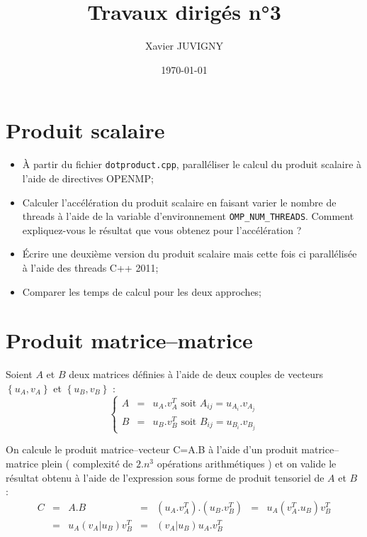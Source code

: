 \documentclass[11pt,a4paper]{article}
\author{Xavier JUVIGNY}
\date{\today}
\title{Travaux dirigés n°3}
\begin{document}
\maketitle
\tableofcontents

\section{Produit scalaire}

\begin{itemize}
\item \`A partir du fichier \texttt{dotproduct.cpp}, paralléliser le calcul du produit scalaire à l'aide de directives OPENMP;
\item Calculer l'accélération du produit scalaire en faisant varier le nombre de threads à l'aide de la variable d'environnement
\texttt{OMP\_NUM\_THREADS}. Comment expliquez-vous le résultat que vous obtenez pour l'accélération ?
\item \'Ecrire une deuxième version du produit scalaire mais cette fois ci parallélisée à l'aide des threads C++ 2011;
\item Comparer les temps de calcul pour les deux approches;
\end{itemize}

\section{Produit matrice--matrice}

Soient $A$ et $B$ deux matrices définies à l'aide de deux couples de vecteurs $\left\{u_{A},v_{A}\right\}$ et 
$\left\{u_{B},v_{B}\right\}$ :
\[
\left\{
	\begin{array}{lcl}
	A & = & u_{A}.v_{A}^{T}\mbox{ soit } A_{ij} = u_{A_{i}}.v_{A_{j}} \\
	B & = & u_{B}.v_{B}^{T}\mbox{ soit } B_{ij} = u_{B_{i}}.v_{B_{j}}
    \end{array}
\right.
\]

On calcule le produit matrice--vecteur C=A.B à l'aide d'un produit matrice--matrice plein ( complexité de $2.n^{3}$ opérations arithmétiques )
et on valide le résultat obtenu à l'aide de l'expression sous forme de produit tensoriel de $A$ et $B$ :
\[
\begin{array}{lclclcl}
C & = & A.B & = & \left(u_{A}.v_{A}^{T}\right).\left(u_{B}.v_{B}^{T}\right) & = &  u_{A}\left(v_{A}^{T}.u_{B}\right)v_{B}^{T}\\
 &=& u_{A}\left(v_{A}|u_{B}\right)v_{B}^{T} & = & \left(v_{A}|u_{B}\right)u_{A}.v_{B}^{T}
 \end{array}
\]
\end{document}
